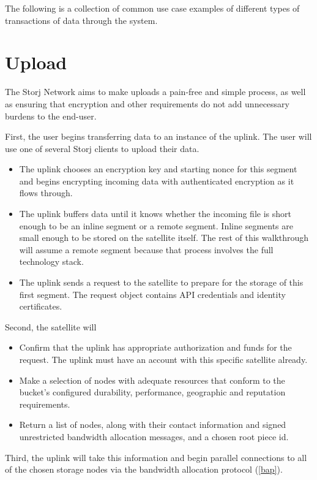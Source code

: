 \documentclass[11pt,fleqn,openany]{book}
\begin{document}
The following is a collection of common use case examples of different types of
transactions of data through the system.

\section{Upload}

The Storj Network aims to make uploads a pain-free and simple process, as well
as ensuring that encryption and other requirements do not add unnecessary
burdens to the end-user.

First, the user begins transferring data to an instance of the uplink. The
user will use one of several Storj clients to upload their data.

\begin{itemize}
\item The uplink chooses an encryption key and starting nonce for
  this segment and begins encrypting incoming data with authenticated
  encryption as it flows through.
\item The uplink buffers data until it knows whether the incoming file is
short enough to be an inline segment or a remote segment. Inline segments are
small enough to be stored on the satellite itself. The rest of this
walkthrough will assume a remote segment because that process involves the
full technology stack.
\item The uplink sends a request to the satellite to prepare for the storage
of this first segment. The request object contains API credentials and identity
certificates.
\end{itemize}

Second, the satellite will
\begin{itemize}
\item Confirm that the uplink has appropriate authorization and funds for
  the request. The uplink must have an account with this specific satellite
  already.
\item Make a selection of nodes with adequate resources that conform to the
  bucket's configured durability, performance, geographic and reputation
  requirements.
\item Return a list of nodes, along with their contact information and
  signed unrestricted bandwidth allocation messages, and a chosen root piece
  id.
\end{itemize}

Third, the uplink will take this information and begin parallel connections to
  all of the chosen storage nodes via the bandwidth allocation protocol
  (\ref{bap}).
\end{document}
